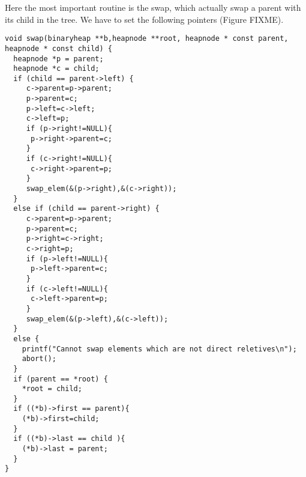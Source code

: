 \documentclass{article}[12pt]
\begin{document}
Here the most important routine is the swap, which
actually swap a parent with its child in the tree.
We have to set the following pointers (Figure FIXME).
\begin{lstlisting}
void swap(binaryheap **b,heapnode **root, heapnode * const parent, heapnode * const child) {
  heapnode *p = parent;
  heapnode *c = child;
  if (child == parent->left) {
     c->parent=p->parent;
     p->parent=c;
     p->left=c->left;
     c->left=p;
     if (p->right!=NULL){
      p->right->parent=c;
     }
     if (c->right!=NULL){
      c->right->parent=p;
     }
     swap_elem(&(p->right),&(c->right));
  }
  else if (child == parent->right) {
     c->parent=p->parent;
     p->parent=c;
     p->right=c->right;
     c->right=p;
     if (p->left!=NULL){
      p->left->parent=c;
     }
     if (c->left!=NULL){
      c->left->parent=p;
     }
     swap_elem(&(p->left),&(c->left));
  }
  else {
    printf("Cannot swap elements which are not direct reletives\n");
    abort();
  }
  if (parent == *root) {
    *root = child;
  }
  if ((*b)->first == parent){
    (*b)->first=child;
  }
  if ((*b)->last == child ){
    (*b)->last = parent;
  }
}
\end{lstlisting}
\end{document}
